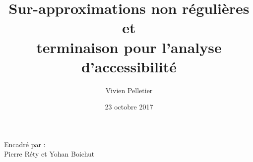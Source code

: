 \author{
  Vivien Pelletier
}
\title[Soutenance de thèse]{Sur-approximations non régulières et\\ terminaison pour l'analyse d'accessibilité}
\date{23 octobre 2017}
\institute
{
  \footnotesize{Encadré par :}\\
  Pierre Réty et Yohan Boichut
}
